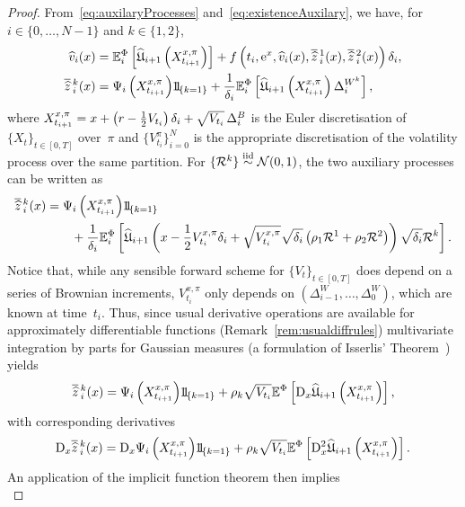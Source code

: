 \begin{proof}
From~\eqref{eq:auxilaryProcesses} and~\eqref{eq:existenceAuxilary}, we have, for $i\in\{0,\dots,N-1\}$ and $k\in\{1,2\}$,
    \begin{align*}
    \widehat{v}_{i}(x) &= \EE^\Phi_{i}\left[\widehat{\Uf}_{i+1}\left(X^{x,\pi}_{t_{i+1}}\right)\right] + f\left(t_i, \E^{x}, \widehat{v}_{i}(x), \zowO_{i}(x), \zowT_{i}(x)\right) \Deli, \\
    \zowk_{i}(x) &= \Psi_i\left(X^{x,\pi}_{t_{i+1}}\right)\ind_{\{k=1\}} + \frac{1}{\Deli} \EE^\Phi_{i}\left[\widehat{\Uf}_{i+1}\left(X^{x,\pi}_{t_{i+1}}\right) \Delta^{W^k}_{i}\right],
    \end{align*}
    where $X^{x,\pi}_{t_{i+1}} = x + \left(r- \frac12 V_{t_i}\right)\delta_{i}  + \sqrt{V_{t_i}}\,\Delta^{B}_{i}$ is 
    the Euler discretisation of $\{X_t\}_{t\in[0, T]}$ over~$\pi$ and $\{V^\pi_{t_i}\}_{i=0}^{N}$ is the appropriate discretisation of the volatility process over the same partition. 
    For $\{\mathcal{R}^k\}\overset{{\mathrm{iid}}}{\sim}\mathcal{N}(0,1)$, the two auxiliary processes can be written as
    \begin{align*}
        \zowk_{i}(x) 
        &= \Psi_i\left(X^{x,\pi}_{t_{i+1}}\right)\ind_{\{k=1\}} \\
        &\qquad + \frac{1}{\Deli} \EE^\Phi_{i}\left[\widehat{\Uf}_{i+1}\left(x - \frac{1}{2}V^{x,\pi}_{t_i}\Deli + \sqrt{V^{x,\pi}_{t_i}}\sqrt{\Deli}\left(\rho_1 \Rr^1 + \rho_2 \Rr^2\right)\right) \sqrt{\Deli} \Rr^k\right].
    \end{align*}
    Notice that, while any sensible forward scheme for $\{V_t\}_{t\in[0,T]}$ does depend on a series of Brownian increments, $V^{x,\pi}_{t_i}$ only depends on $\left(\Delta^{W}_{i-1},\dots,\Delta^{W}_{0}\right)$, which are known at time~$t_i$. Thus, since usual derivative operations are available for approximately differentiable functions (Remark~\ref{rem:usualdiffrules}) multivariate integration by parts for Gaussian measures (a formulation of Isserlis' Theorem~\cite{Isserlis1918OnVariables}) yields
    $$
    \zowk_{i}(x) = \Psi_i\left(X^{x,\pi}_{t_{i+1}}\right)\ind_{\{k=1\}} + \rho_k\sqrt{V_{t_i}}\EE^\Phi\left[\Dx \widehat \Uf_{i+1}\left(X^{x, \pi}_{t_{i+1}}\right)\right],
    $$
    with corresponding derivatives
    $$
    \Dx\zowk_{i}(x) = \Dx\Psi_i\left(X^{x,\pi}_{t_{i+1}}\right)\ind_{\{k=1\}} + \rho_k\sqrt{V_{t_i}}\EE^\Phi\left[\Dx^2 \widehat\Uf_{i+1}\left(X^{x,\pi}_{t_{i+1}}\right)\right].
    $$
An application of the implicit function theorem then implies
\begin{equation}\label{eq:derivativeVhat}

\end{equation}
\end{proof}
